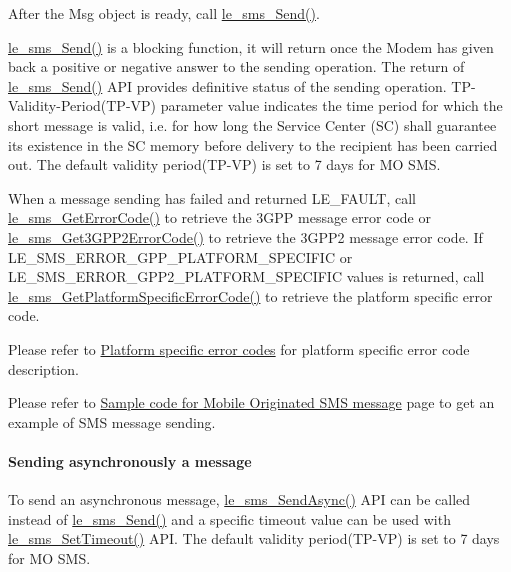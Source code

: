 After the Msg object is ready, call {\ttfamily \hyperlink{le__sms__interface_8h_ab7dee7d2c74cfcadd9ea0d5fe1786dfc}{le\+\_\+sms\+\_\+\+Send()}}.

{\ttfamily \hyperlink{le__sms__interface_8h_ab7dee7d2c74cfcadd9ea0d5fe1786dfc}{le\+\_\+sms\+\_\+\+Send()}} is a blocking function, it will return once the Modem has given back a positive or negative answer to the sending operation. The return of {\ttfamily \hyperlink{le__sms__interface_8h_ab7dee7d2c74cfcadd9ea0d5fe1786dfc}{le\+\_\+sms\+\_\+\+Send()}} A\+PI provides definitive status of the sending operation. T\+P-\/\+Validity-\/\+Period(T\+P-\/\+VP) parameter value indicates the time period for which the short message is valid, i.\+e. for how long the Service Center (SC) shall guarantee its existence in the SC memory before delivery to the recipient has been carried out. The default validity period(T\+P-\/\+VP) is set to 7 days for MO S\+MS.

When a message sending has failed and returned L\+E\+\_\+\+F\+A\+U\+LT, call \hyperlink{le__sms__interface_8h_a9ee511af99c91383344debf532fae1ae}{le\+\_\+sms\+\_\+\+Get\+Error\+Code()} to retrieve the 3\+G\+PP message error code or \hyperlink{le__sms__interface_8h_a46afe91bbded617ad444ea29a9dd910a}{le\+\_\+sms\+\_\+\+Get3\+G\+P\+P2\+Error\+Code()} to retrieve the 3\+G\+P\+P2 message error code. If L\+E\+\_\+\+S\+M\+S\+\_\+\+E\+R\+R\+O\+R\+\_\+G\+P\+P\+\_\+\+P\+L\+A\+T\+F\+O\+R\+M\+\_\+\+S\+P\+E\+C\+I\+F\+IC or L\+E\+\_\+\+S\+M\+S\+\_\+\+E\+R\+R\+O\+R\+\_\+G\+P\+P2\+\_\+\+P\+L\+A\+T\+F\+O\+R\+M\+\_\+\+S\+P\+E\+C\+I\+F\+IC values is returned, call \hyperlink{le__sms__interface_8h_a9cfbc2131df38f99272a71bf05cb1254}{le\+\_\+sms\+\_\+\+Get\+Platform\+Specific\+Error\+Code()} to retrieve the platform specific error code.

Please refer to \hyperlink{platformConstraintsSpecificErrorCodes}{Platform specific error codes} for platform specific error code description.

Please refer to \hyperlink{c_smsSampleMO}{Sample code for Mobile Originated S\+MS message} page to get an example of S\+MS message sending.\hypertarget{c_sms_le_sms_ops_async_sending}{}\paragraph{Sending asynchronously a message}\label{c_sms_le_sms_ops_async_sending}
To send an asynchronous message, \hyperlink{le__sms__interface_8h_a0ba61dcf10157e9982702373577c6b45}{le\+\_\+sms\+\_\+\+Send\+Async()} A\+PI can be called instead of \hyperlink{le__sms__interface_8h_ab7dee7d2c74cfcadd9ea0d5fe1786dfc}{le\+\_\+sms\+\_\+\+Send()} and a specific timeout value can be used with \hyperlink{le__sms__interface_8h_a2b14febf0e2285b0b3c2dbcd1c2bb7b0}{le\+\_\+sms\+\_\+\+Set\+Timeout()} A\+PI. The default validity period(T\+P-\/\+VP) is set to 7 days for MO S\+MS.

